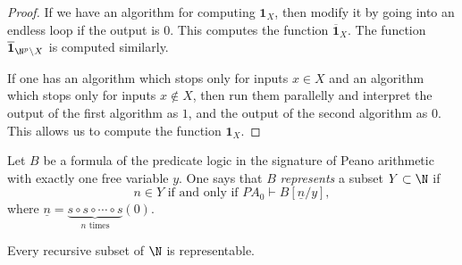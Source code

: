 \begin{page}
\setcounter{section}{3}
\setcounter{subsection}{4}
\setcounter{dfn}{29}
\label{portion:750}

\begin{proof}
If we have an algorithm for computing $\mathbf{1}_X$, then modify it by going into an endless loop if the output is $0$.
This computes the function $\overline{\mathbf{1}}_X$. The function $\overline{\mathbf{1}}_{\N^p \setminus X}$ is computed similarly.

If one has an algorithm which stops only for inputs $x \in X$ and an algorithm which stops only for inputs $x \notin X$, then run them parallelly
and interpret the output of the first algorithm as $1$, and the output of the second algorithm as $0$.
This allows us to compute the function $\mathbf{1}_X$.
\end{proof}



\end{page}

\begin{page}
\setcounter{section}{3}
\setcounter{subsection}{4}
\setcounter{dfn}{30}
\label{portion:752}

\begin{dfn}
Let $B$ be a formula of the predicate logic in the signature of Peano arithmetic with exactly one free variable $y$.
One says that $B$ \emph{represents} a subset $Y \subset \N$ if
\[
n \in Y \text{ if and only if }PA_0 \vdash B[\underline{n}/y],
\]
where $\underline{n} = \underbrace{s \circ s \circ \cdots \circ s}_{n\text{ times}}(0)$.
\end{dfn}

\end{page}

\begin{page}
\setcounter{section}{3}
\setcounter{subsection}{4}
\setcounter{dfn}{31}
\label{portion:755}

\begin{thm}
\label{thm:ReprThm}
Every recursive subset of $\N$ is representable.
\end{thm}

\end{page}

